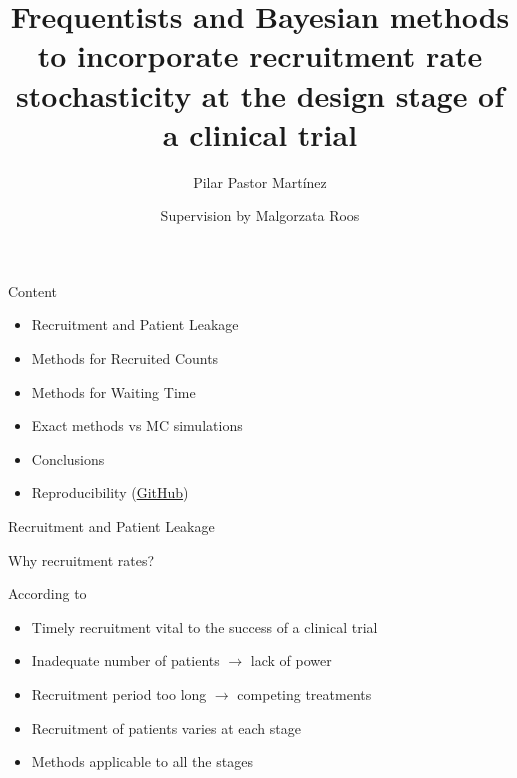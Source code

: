 \documentclass[english]{beamer}\usepackage[]{graphicx}\usepackage[]{xcolor}
\title[Recruitment rate stochasticity
at the design stage of a clinical trial, Master Exam]{Frequentists and Bayesian methods to incorporate
recruitment rate stochasticity
at the design stage of a clinical trial}
\author{Supervision by Malgorzata Roos}
\institute{Biostatistics Master Exam}  %
\subtitle{Pilar Pastor Martínez}
\begin{document}
\maketitle

\begin{frame}{Content}

\begin{itemize}[label = ]
\item Recruitment and Patient Leakage
\item Methods for Recruited Counts
\item Methods for Waiting Time
\item Exact methods vs MC simulations
\item Conclusions
\item Reproducibility (\href{https://github.com/ppasto/masterthesis}{GitHub})
\end{itemize}

\end{frame}

\begin{frame}{Recruitment and Patient Leakage}

\end{frame}

\begin{frame}{Why recruitment rates?}

According to \cite{carter2004application}
\begin{itemize}[label = ]
\item Timely recruitment vital to the success of a clinical trial
\item Inadequate number of patients $\rightarrow$ lack of power
\item Recruitment period too long $\rightarrow$ competing treatments
\item Recruitment of patients varies at each stage 
\item Methods applicable to all the stages
\end{itemize}

\end{frame}
\end{document}
